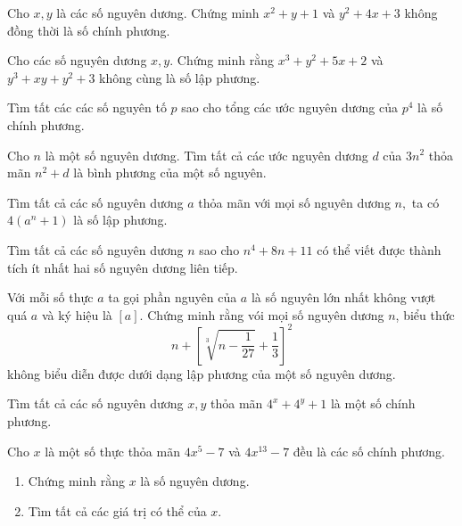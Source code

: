 \begin{btt}
Cho $x, y$ là các số nguyên dương. Chứng minh $x^2+y+1$ và $y^2+4x+3$ không đồng thời là số chính phương.
\end{btt}

\begin{btt}
Cho các số nguyên dương $x,y.$ Chứng minh rằng $x^3+y^2+5x+2$ và $y^3+xy+y^2+3$ không cùng là số lập phương.
\end{btt}

\begin{btt}
Tìm tất các các số nguyên tố $p$ sao cho tổng các ước nguyên dương của $p^4$ là số chính phương.
\end{btt}

\begin{btt}
Cho \(n\) là một số nguyên dương. Tìm tất cả các ước nguyên dương \(d\) của \(3n^2\) thỏa mãn \(n^2+d\) là bình phương của một số nguyên.
\end{btt}

\begin{btt}
Tìm tất cả các số nguyên dương $a$ thỏa mãn với mọi số nguyên dương $n,$ ta có $4\left(a^n+1\right)$ là số lập phương.
\end{btt}

\begin{btt}
Tìm tất cả các số nguyên dương $n$ sao cho $n^4+8n+11$ có thể viết được thành tích ít nhất hai số nguyên dương liên tiếp.
\end{btt}

\begin{btt}
Với mỗi số thực $a$ ta gọi phần nguyên của $a$ là số nguyên lớn nhất không vượt quá $a$ và ký hiệu là $[{a}]$. Chứng minh rằng vói mọi số nguyên dương ${n}$, biểu thức
$${n}+\left[\sqrt[3]{{n}-\dfrac{1}{27}}+\dfrac{1}{3}\right]^{2}$$ không biểu diễn được dưới dạng lập phương của một số nguyên dương.
\end{btt}

\begin{btt}
Tìm tất cả các số nguyên dương $x,y$ thỏa mãn $4^x+4^y+1$ là một số chính phương.
\end{btt}

\begin{btt}
Cho $x$ là một số thực thỏa mãn $4x^5-7$ và $4x^{13}-7$ đều là các số chính phương.
\begin{enumerate}[a,]
    \item Chứng minh rằng $x$ là số nguyên dương.
    \item Tìm tất cả các giá trị có thể của $x.$
\end{enumerate}
\end{btt}

